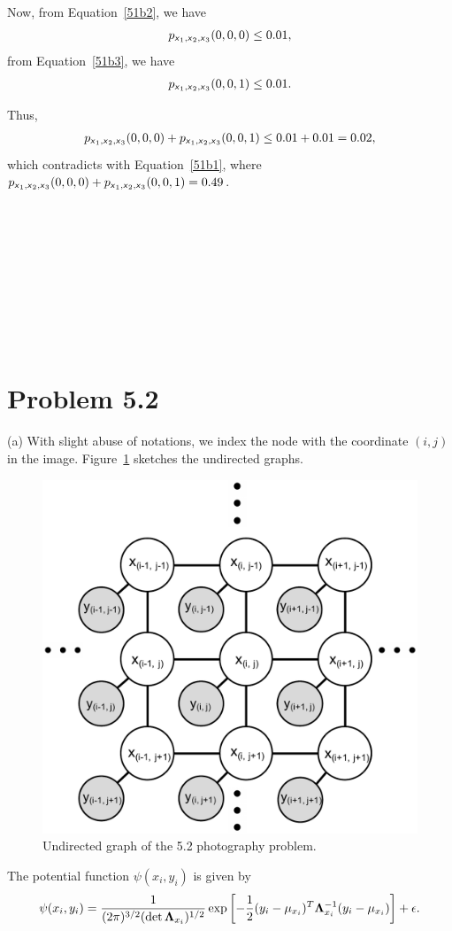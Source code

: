 \documentclass{article}
\newcommand{\s}[1]{\textsf{\textit{#1}}}
\newcommand{\qeds}{\hfill\qedsymbol}
\begin{document}
Now, from Equation~\eqref{51b2}, we have
\begin{align*}
	p_{\s{x}_1, \s{x}_2, \s{x}_3}(0, 0, 0) \leq 0.01,
\end{align*}
from Equation~\eqref{51b3}, we have
\begin{align*}
	p_{\s{x}_1, \s{x}_2, \s{x}_3}(0, 0, 1) \leq 0.01.
\end{align*}
%

Thus, 
\begin{align*}
	p_{\s{x}_1, \s{x}_2, \s{x}_3}(0, 0, 0) + p_{\s{x}_1, \s{x}_2, \s{x}_3}(0, 0, 1) \leq 0.01 + 0.01 = 0.02,
\end{align*}
%
which contradicts with Equation~\eqref{51b1}, where 
$p_{\s{x}_1, \s{x}_2, \s{x}_3}(0, 0, 0) + p_{\s{x}_1, \s{x}_2, \s{x}_3}(0, 0, 1) = 0.49$.
\qeds
\\
\\
\\
\\
\\
\\
\\
\\
\\
\\

\pagebreak
%
\section*{Problem 5.2}
(a) With slight abuse of notations, we index the node with the coordinate
$(i, j)$ in the image. Figure~\ref{f:52a} sketches the undirected graphs.
%
\begin{figure}[h]
  \centering
  \includegraphics[width=0.4\columnwidth]{52a.pdf}
    \vspace{-0.1cm}
  \caption{Undirected graph of the 5.2 photography problem.}
  \label{f:52a}
\end{figure}
%

The potential function $\psi(x_i, y_i)$ is given by
\begin{align*}
	\psi(x_i, y_i) = \frac{1}{(2\pi)^{3/2}(\det {\bf\Lambda}_{x_i})^{1/2}}
	\exp\left[-\frac{1}{2}(y_i-\mu_{x_i})^T\mathbf{\Lambda}^{-1}_{x_i}(y_i - \mu_{x_i})\right] + \epsilon.
\end{align*}
\\
\end{document}
